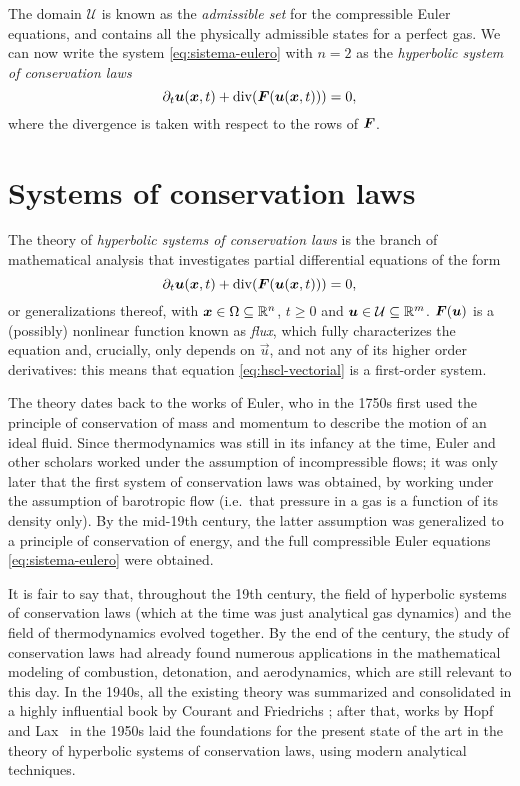 The domain $\mathcal{U}$ is known as the \emph{admissible set} for
the compressible Euler equations, and contains all the physically
admissible states for a perfect gas. We can now write the system
\eqref{eq:sistema-eulero} with $n = 2$ as the
\emph{hyperbolic system of conservation laws}
\[
\partial_t \bm{u}(\bm{x},t) + \operatorname{div}(\bm{F}(\bm{u}(\bm{x},t))) = 0,
\]
where the divergence is taken with respect to the rows of $\bm{F}$.

\section{Systems of conservation laws} \label{sec:conservation-laws}
The theory of \emph{hyperbolic systems of conservation laws}
is the branch of mathematical analysis that investigates
partial differential equations of the form
\begin{equation} \label{eq:hscl-vectorial}
\partial_t \bm{u}(\bm{x},t) + \operatorname{div}(\bm{F}(\bm{u}(\bm{x},t))) = 0,
\end{equation}
or generalizations thereof,
with $\bm{x} \in \Omega \subseteq \mathbb{R}^n$, $t \geq 0$ and
$\bm{u} \in \mathcal{U} \subseteq \mathbb{R}^m$.
$\bm{F}(\bm{u})$ is a (possibly) nonlinear function
known as \emph{flux}, which fully characterizes the equation and,
crucially, only depends on $\vec{u}$, and not any of its higher order
derivatives: this means that equation
\eqref{eq:hscl-vectorial} is a first-order system.

The theory dates back to the works of Euler, who in the 1750s
first used the principle of conservation of mass and momentum
to describe the motion of an ideal fluid.
Since thermodynamics was still in its infancy at the time,
Euler and other scholars worked under the assumption of incompressible
flows; it was only later that the first system of conservation laws was
obtained, by working under the assumption of barotropic flow
(i.e.\ that pressure in a gas is a function of its density only).
By the mid-19th century, the latter assumption was generalized to
a principle of conservation of energy, and the full compressible Euler
equations \eqref{eq:sistema-eulero} were obtained.

It is fair to say that, throughout the 19th century, the field
of hyperbolic systems of conservation laws (which at the time was just
analytical gas dynamics) and the field of thermodynamics evolved together.
By the end of the century, the study of conservation laws
had already found numerous applications in the mathematical modeling
of combustion, detonation, and aerodynamics, which are still
relevant to this day.
In the 1940s, all the existing theory was summarized and consolidated
in a highly influential book by Courant and Friedrichs
\cite{courant-friedrichs}; after that, works by Hopf and Lax~\cite{hopf,lax}
in the 1950s laid the foundations for the present state of the art
in the theory of hyperbolic systems of conservation laws,
using modern analytical techniques.

